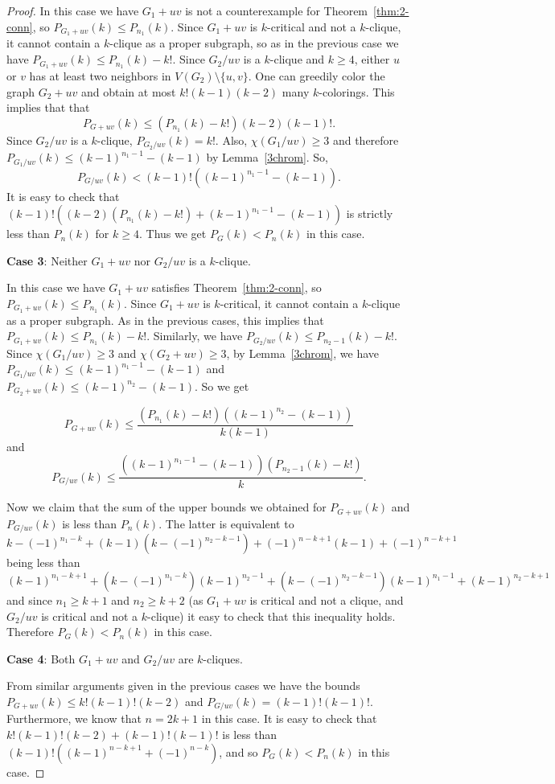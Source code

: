 \documentclass[11pt]{article}
\theoremstyle{plain}
\theoremstyle{definition}
\theoremstyle{remark}
\begin{document}
\begin{proof}
In this case we have $G_1+uv$ is not a counterexample for Theorem~\ref{thm:2-conn}, so $P_{G_1+uv}(k)\leq P_{n_1}(k)$. Since $G_1+uv$ is $k$-critical and not a $k$-clique, it cannot contain a $k$-clique as a proper subgraph, so as in the previous case we have
$P_{G_1+uv}(k)\leq P_{n_1}(k)-k!$. Since $G_2/uv$ is a $k$-clique and $k\geq 4$, either $u$ or $v$ has at least two neighbors in $V(G_2)\setminus \{u,v\}$. One can greedily color the graph $G_2+uv$ and  obtain at most $k!(k-1)(k-2)$ many $k$-colorings. This implies that that 
$$P_{G+uv}(k)\leq (P_{n_1}(k)-k!)(k-2)(k-1)!.$$
Since $G_2/uv$ is a $k$-clique, $P_{G_2/uv}(k)=k!$. Also, $\chi(G_1/uv)\geq 3$ and therefore  $P_{G_1/uv}(k)\leq (k-1)^{n_1-1}-(k-1)$ by Lemma~\ref{3chrom}. So,
$$P_{G/uv}(k)<(k-1)!\left((k-1)^{n_1-1}-(k-1)\right).$$
It is easy to check that $(k-1)!((k-2)(P_{n_1}(k)-k!)+(k-1)^{n_1-1}-(k-1))$ is strictly less than $P_n(k)$ for $k \geq 4$. Thus we get $P_G(k)<P_n(k)$ in this case.

\medskip

\textbf{Case 3}: Neither  $G_1+uv$ nor   $G_2/uv$ is a $k$-clique.

In this case we have $G_1+uv$  satisfies Theorem~\ref{thm:2-conn}, so $P_{G_1+uv}(k)\leq P_{n_1}(k)$. Since $G_1+uv$ is $k$-critical, it cannot contain a $k$-clique as a proper subgraph.  As in the previous cases, this implies that $P_{G_1+uv}(k)\leq P_{n_1}(k)-k!$. Similarly, we have $P_{G_2/uv}(k)\leq P_{n_2-1}(k)-k!$. Since $\chi (G_1/uv)\geq 3$ and $\chi(G_2+uv)\geq 3$, by Lemma~\ref{3chrom}, we have $P_{G_1/uv}(k)\leq(k-1)^{n_1-1}-(k-1)$ and $P_{G_2+uv}(k)\leq(k-1)^{n_2}-(k-1)$. So we get

$$P_{G+uv}(k)\leq\frac{(P_{n_1}(k)-k!)((k-1)^{n_2}-(k-1))}{k(k-1)}$$
and 
$$P_{G/uv}(k)\leq\frac{((k-1)^{n_1-1}-(k-1))(P_{n_2-1}(k)-k!)}{k}.$$

Now we claim that the sum of the upper bounds we obtained for $P_{G+uv}(k)$ and $P_{G/uv}(k)$ is less than $P_n(k)$.
The latter is equivalent to 
\[
k-(-1)^{n_1-k}+(k-1)(k-(-1)^{n_2-k-1})+(-1)^{n-k+1}(k-1)+(-1)^{n-k+1}
\]
being less than
\[
(k-1)^{n_1-k+1}+(k-(-1)^{n_1-k})(k-1)^{n_2-1}+(k-(-1)^{n_2-k-1})(k-1)^{n_1-1}+(k-1)^{n_2-k+1}
\]
and since $n_1 \geq k+1$ and $n_2 \geq k+2$ (as $G_1+uv$ is critical and not a clique, and $G_2/uv$ is critical and not a $k$-clique) it easy to check that this inequality holds. Therefore $P_{G}(k)<P_n(k)$ in this case.

\medskip

\textbf{Case 4}: Both  $G_1+uv$ and $G_2/uv$ are $k$-cliques.

From similar arguments given in the previous cases we have the bounds $P_{G+uv}(k)\leq k!(k-1)!(k-2)$ and $P_{G/uv}(k)=(k-1)!(k-1)!$.  Furthermore, we know that $n=2k+1$ in this case. It is easy to check that $k!(k-1)!(k-2)+(k-1)!(k-1)!$ is less than $(k-1)!\left((k-1)^{n-k+1}+(-1)^{n-k}\right)$, and so $P_{G}(k)<P_n(k)$ in this case.
\end{proof}
\end{document}
